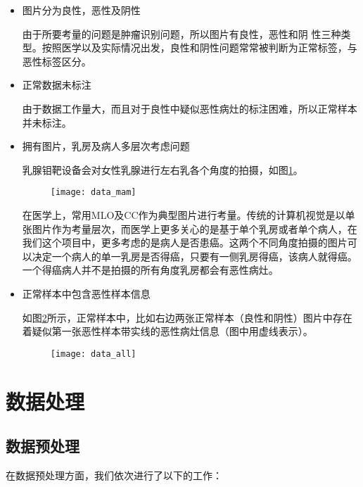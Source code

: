 \begin{itemize}
	\item 图片分为良性，恶性及阴性
	
	由于所要考量的问题是肿瘤识别问题，所以图片有良性，恶性和阴
性三种类型。按照医学以及实际情况出发，良性和阴性问题常常被判断为正常标签，与恶性标签区分。

	\item 正常数据未标注
	
	由于数据工作量大，而且对于良性中疑似恶性病灶的标注困难，所以正常样本并未标注。

	\item 拥有图片，乳房及病人多层次考虑问题
	
	乳腺钼靶设备会对女性乳腺进行左右乳各个角度的拍摄，如图\ref{fig:data_mam}。
				\begin{figure}[!htbp]
    \centering
    \texttt{[image: data\_mam]}
    \label{fig:data_mam}
	\end{figure}
	
	在医学上，常用MLO及CC作为典型图片进行考量。传统的计算机视觉是以单张图片作为考量层次，而医学上更多关心的是基于单个乳房或者单个病人，在我们这个项目中，更多考虑的是病人是否患癌。这两个不同角度拍摄的图片可以决定一个病人的单一乳房是否得癌，只要有一侧乳房得癌，该病人就得癌。一个得癌病人并不是拍摄的所有角度乳房都会有恶性病灶。
	
	\item 正常样本中包含恶性样本信息
	
	如图\ref{fig:data_all}所示，正常样本中，比如右边两张正常样本（良性和阴性）图片中存在着疑似第一张恶性样本带实线的恶性病灶信息（图中用虚线表示）。
	\begin{figure}[!htbp]
    \centering
    \texttt{[image: data\_all]}
    \label{fig:data_all}
	\end{figure}
	
	
\end{itemize}

\section{数据处理}
\subsection{数据预处理}
在数据预处理方面，我们依次进行了以下的工作：


